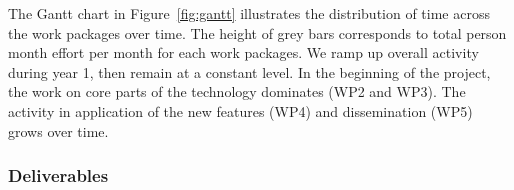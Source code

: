 
\pagebreak The Gantt chart in
Figure~\ref{fig:gantt} %
illustrates the distribution of time across the work packages over time.
The height of grey bars corresponds to total person month effort per
month for each work packages. We ramp up overall activity during year 1, then remain
at a constant level. In the beginning of the project, the work on core parts of
the technology dominates (WP2 and WP3). The activity in application of the new features (WP4) and dissemination
(WP5) grows over time.
\ganttchart[draft,xscale=.4,milestones,yscale=0.9,step=3]


\begin{workplan}





\subsubsection{Deliverables}\label{sec:deliverables}
%


\end{workplan}




